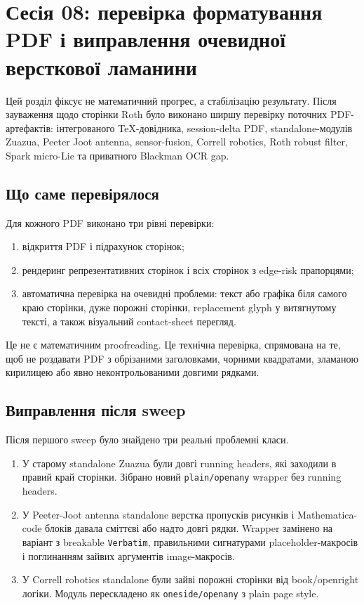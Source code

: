 
\chapter{Сесія 08: перевірка форматування PDF і виправлення очевидної версткової ламанини}
\label{chap:prior_pdf_qa}

Цей розділ фіксує не математичний прогрес, а стабілізацію результату. Після зауваження щодо сторінки Roth було виконано ширшу перевірку поточних PDF-артефактів: інтегрованого TeX-довідника, session-delta PDF, standalone-модулів Zuazua, Peeter Joot antenna, sensor-fusion, Correll robotics, Roth robust filter, Spark micro-Lie та приватного Blackman OCR gap.

\section{Що саме перевірялося}
Для кожного PDF виконано три рівні перевірки:
\begin{enumerate}
\item відкриття PDF і підрахунок сторінок;
\item рендеринг репрезентативних сторінок і всіх сторінок з edge-risk прапорцями;
\item автоматична перевірка на очевидні проблеми: текст або графіка біля самого краю сторінки, дуже порожні сторінки, replacement glyph у витягнутому тексті, а також візуальний contact-sheet перегляд.
\end{enumerate}

Це не є математичним proofreading. Це технічна перевірка, спрямована на те, щоб не роздавати PDF з обрізаними заголовками, чорними квадратами, зламаною кирилицею або явно неконтрольованими довгими рядками.

\section{Виправлення після sweep}
Після першого sweep було знайдено три реальні проблемні класи.
\begin{enumerate}
\item У старому standalone Zuazua були довгі running headers, які заходили в правий край сторінки. Зібрано новий \texttt{plain/openany} wrapper без running headers.
\item У Peeter-Joot antenna standalone верстка пропусків рисунків і Mathematica-code блоків давала сміттєві або надто довгі рядки. Wrapper замінено на варіант з breakable \texttt{Verbatim}, правильними сигнатурами placeholder-макросів і поглинанням зайвих аргументів image-макросів.
\item У Correll robotics standalone були зайві порожні сторінки від book/openright логіки. Модуль перескладено як \texttt{oneside/openany} з plain page style.
\end{enumerate}


